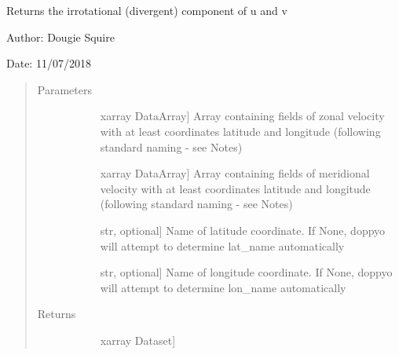 \documentclass[letterpaper,10pt,english]{sphinxmanual}
\begin{document}

\begin{fulllineitems}
\label{\detokenize{diagnostic_doc:diagnostic.divergent}}
Returns the irrotational (divergent) component of u and v

\begin{DUlineblock}{0em}
\item[] Author: Dougie Squire
\item[] Date: 11/07/2018
\end{DUlineblock}
\begin{quote}\begin{description}
\item[{Parameters}] \leavevmode\begin{description}
\item[{}] \leavevmode{[}xarray DataArray{]}
Array containing fields of zonal velocity with at least coordinates latitude and longitude                     (following standard naming - see Notes)

\item[{}] \leavevmode{[}xarray DataArray{]}
Array containing fields of meridional velocity with at least coordinates latitude and                     longitude (following standard naming - see Notes)

\item[{}] \leavevmode{[}str, optional{]}
Name of latitude coordinate. If None, doppyo will attempt to determine lat\_name                     automatically

\item[{}] \leavevmode{[}str, optional{]}
Name of longitude coordinate. If None, doppyo will attempt to determine lon\_name                     automatically

\end{description}

\item[{Returns}] \leavevmode\begin{description}
\item[{}] \leavevmode{[}xarray Dataset{]}


\end{description}
\end{description}
\end{quote}
\end{fulllineitems}
\end{document}
